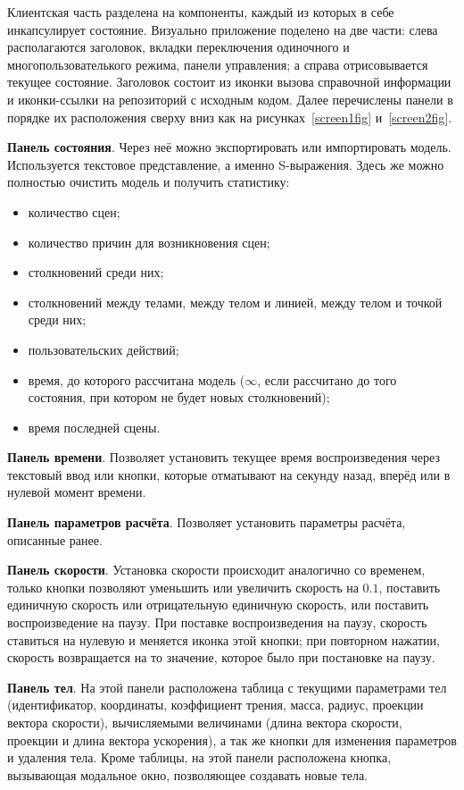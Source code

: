 \TODO Клиентская часть разделена на компоненты, каждый из которых в себе инкапсулирует состояние.
Визуально приложение поделено на две части: слева располагаются заголовок,
вкладки переключения одиночного и многопользователького режима, панели управления;
а справа отрисовывается текущее состояние.
Заголовок состоит из иконки вызова справочной информации
и иконки-ссылки на репозиторий с исходным кодом. Далее перечислены панели в порядке их 
расположения сверху вниз как на рисунках~\ref{screen1fig} и~\ref{screen2fig}.

\textbf{Панель состояния}. Через неё можно экспортировать или импортировать модель.
Используется текстовое представление, а именно S-выражения. Здесь же можно полностью очистить модель и
получить статистику:

\begin{itemize}
    \item количество сцен;
    \item количество причин для возникновения сцен;
    \item столкновений среди них;
    \item столкновений между телами, между телом и линией, между телом и точкой среди них;
    \item пользовательских действий;
    \item время, до которого рассчитана модель (\(\infty\), если рассчитано до того состояния, при котором не будет новых столкновений);
    \item время последней сцены.
\end{itemize}

\textbf{Панель времени}. Позволяет установить текущее время воспроизведения через текстовый ввод или кнопки,
которые отматывают на секунду назад, вперёд или в нулевой момент времени.

\textbf{Панель параметров расчёта}.
Позволяет установить параметры расчёта, описанные ранее.

\textbf{Панель скорости}. Установка скорости происходит аналогично со временем, только кнопки 
позволяют уменьшить или увеличить скорость на \(0.1\), поставить единичную скорость или
отрицательную единичную скорость, или поставить воспроизведение на паузу.
При поставке воспроизведения на паузу, скорость ставиться на нулевую и меняется иконка этой кнопки;
при повторном нажатии, скорость возвращается на то значение, которое было при постановке на паузу.

\textbf{Панель тел}.
На этой панели расположена таблица с текущими параметрами тел 
(идентификатор, координаты, коэффициент трения, масса, радиус, проекции вектора скорости),
вычисляемыми величинами (длина вектора скорости, проекции и длина вектора ускорения),
а так же кнопки для изменения параметров и удаления тела.
Кроме таблицы, на этой панели расположена кнопка, вызывающая модальное окно, 
позволяющее создавать новые тела.

